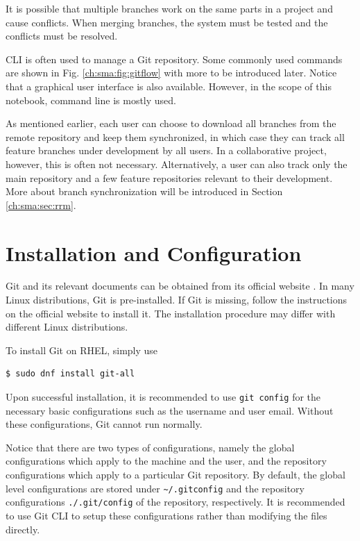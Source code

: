 It is possible that multiple branches work on the same parts in a project and cause conflicts. When merging branches, the system must be tested and the conflicts must be resolved.

CLI is often used to manage a Git repository. Some commonly used commands are shown in Fig. \ref{ch:sma:fig:gitflow} with more to be introduced later. Notice that a graphical user interface is also available. However, in the scope of this notebook, command line is mostly used.

As mentioned earlier, each user can choose to download all branches from the remote repository and keep them synchronized, in which case they can track all feature branches under development by all users. In a collaborative project, however, this is often not necessary. Alternatively, a user can also track only the main repository and a few feature repositories relevant to their development. More about branch synchronization will be introduced in Section \ref{ch:sma:sec:rrm}.

\section{Installation and Configuration}

Git and its relevant documents can be obtained from its official website \cite{git2025}. In many Linux distributions, Git is pre-installed. If Git is missing, follow the instructions on the official website to install it. The installation procedure may differ with different Linux distributions.

To install Git on RHEL, simply use
\begin{lstlisting}
$ sudo dnf install git-all
\end{lstlisting}

Upon successful installation, it is recommended to use \verb|git config| for the necessary basic configurations such as the username and user email. Without these configurations, Git cannot run normally.

Notice that there are two types of configurations, namely the global configurations which apply to the machine and the user, and the repository configurations which apply to a particular Git repository. By default, the global level configurations are stored under \verb|~/.gitconfig| and the repository configurations \verb|./.git/config| of the repository, respectively. It is recommended to use Git CLI to setup these configurations rather than modifying the files directly.

